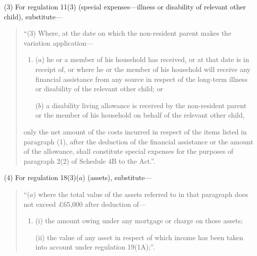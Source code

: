 \documentclass[12pt,a4paper]{article}
\begin{document}
(3) For regulation 11(3) (special expenses—illness or disability of relevant other child), substitute—
\begin{quotation}
“(3) Where, at the date on which the non-resident parent makes the variation application—
\begin{enumerate}\item[]
($a$) he or a member of his household has received, or at that date is in receipt of, or where he or the member of his household will receive any financial assistance from any source in respect of the long-term illness or disability of the relevant other child; or

($b$) a disability living allowance is received by the non-resident parent or the member of his household on behalf of the relevant other child,
\end{enumerate}
only the net amount of the costs incurred in respect of the items listed in paragraph (1), after the deduction of the financial assistance or the amount of the allowance, shall constitute special expenses for the purposes of paragraph 2(2) of Schedule 4B to the Act.”.
\end{quotation}

(4) For regulation 18(3)($a$)  (assets), substitute—
\begin{quotation}
“($a$) where the total value of the assets referred to in that paragraph does not exceed £65,000 after deduction of—
\begin{enumerate}\item[]
(i) the amount owing under any mortgage or charge on those assets;

(ii) the value of any asset in respect of which income has been taken into account under regulation 19(1A);”.
\end{enumerate}
\end{quotation}
\end{document}
